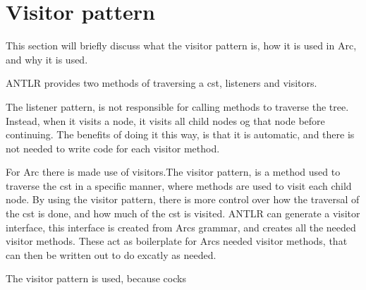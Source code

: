 \section{Visitor pattern}\label{sec:visitorpattern}
This section will briefly discuss what the visitor pattern is, how it is used in Arc, and why it is used. 

ANTLR provides two methods of traversing a \gls{cst}, listeners and visitors. 

The listener pattern, is not responsible for calling methods to traverse the tree. Instead, when it visits a node, it visits all child nodes og that node before continuing. The benefits of doing it this way, is that it is automatic, and there is not needed to write code for each visitor method.

For Arc there is made use of visitors.The visitor pattern, is a method used to traverse the \gls{cst} in a specific manner, where methods are used to visit each child node. By using the visitor pattern, there is more control over how the traversal of the \gls{cst} is done, and how much of the \gls{cst} is visited. ANTLR can generate a visitor interface, this interface is created from Arcs grammar, and creates all the needed visitor methods. These act as boilerplate for Arcs needed visitor methods, that can then be written out to do excatly as needed.

The visitor pattern is used, because cocks


